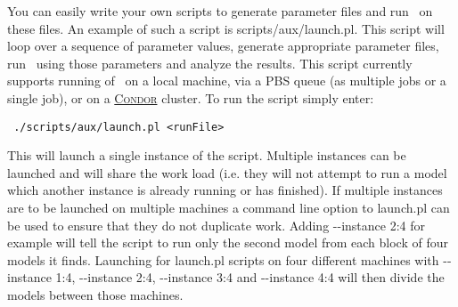 You can easily write your own scripts to generate parameter files and run \glc\ on these files. An example of such a script is {\normalfont \ttfamily scripts/aux/launch.pl}. This script will loop over a sequence of parameter values, generate appropriate parameter files, run \glc\ using those parameters and analyze the results. This script currently supports running of \glc\ on a local machine, via a PBS queue (as multiple jobs or a single job), or on a \href{https://research.cs.wisc.edu/htcondor/}{{\normalfont \scshape Condor}} cluster. To run the script simply enter:
\begin{verbatim}
 ./scripts/aux/launch.pl <runFile>
\end{verbatim}
This will launch a single instance of the script. Multiple instances can be launched and will share the work load (i.e. they will not attempt to run a model which another instance is already running or has finished). If multiple instances are to be launched on multiple machines a command line option to {\normalfont \ttfamily launch.pl} can be used to ensure that they do not duplicate work. Adding {\normalfont \ttfamily -{}-instance 2:4} for example will tell the script to run only the second model from each block of four models it finds. Launching for {\normalfont \ttfamily launch.pl} scripts on four different machines with {\normalfont \ttfamily -{}-instance 1:4}, {\normalfont \ttfamily -{}-instance 2:4}, {\normalfont \ttfamily -{}-instance 3:4} and {\normalfont \ttfamily -{}-instance 4:4} will then divide the models between those machines.

